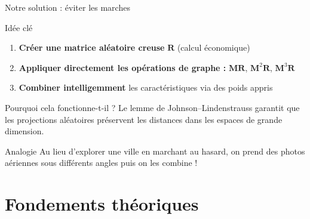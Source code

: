 \documentclass[9pt,aspectratio=169,professionalfonts]{beamer}
\begin{document}
\begin{frame}{Notre solution : éviter les marches}
\begin{block}{Idée clé}
\begin{enumerate}
    \item \textbf{Créer une matrice aléatoire creuse} $\mathbf R$ (calcul économique)
    \item \textbf{Appliquer directement les opérations de graphe :} $\mathbf M \mathbf R$, $\mathbf M^2 \mathbf R$, $\mathbf M^3 \mathbf R$
    \item \textbf{Combiner intelligemment} les caractéristiques via des poids appris
\end{enumerate}
\end{block}

\begin{block}{Pourquoi cela fonctionne-t-il ?}
Le lemme de Johnson–Lindenstrauss garantit que les projections aléatoires préservent les distances dans les espaces de grande dimension.
\end{block}

\begin{exampleblock}{Analogie}
Au lieu d'explorer une ville en marchant au hasard, on prend des photos aériennes sous différents angles puis on les combine !
\end{exampleblock}
\end{frame}

\section{Fondements théoriques}
\end{document}
